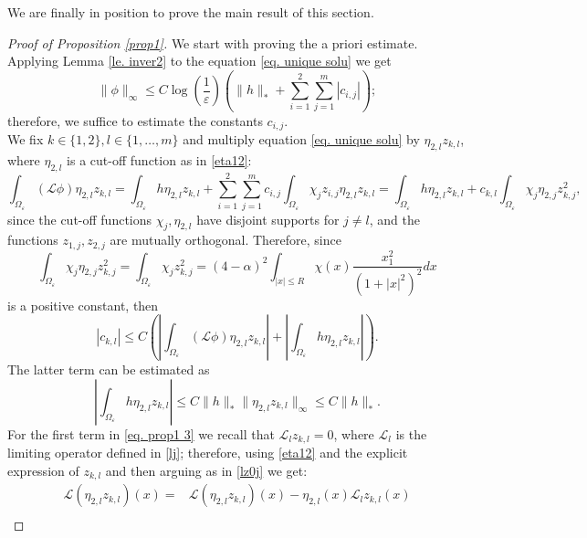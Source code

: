 \documentclass[11pt]{article}
\begin{document}
We are finally in position to prove the main result of this section.
\begin{proof}[Proof of Proposition \ref{prop1}]
We start with proving the a priori estimate.\\
Applying Lemma \ref{le. inver2} to the equation \eqref{eq. unique solu} we get
\begin{equation}\label{eq. prop1 1}
\|\phi\|_\infty\le C\log\left(\frac1\varepsilon\right)\left(\|h\|_\ast+\sum_{i=1}^2\sum_{j=1}^m|c_{i,j}|\right);
\end{equation}
therefore, we suffice to estimate the constants $c_{i,j}$.\\
We fix $k\in\{1,2\},l\in\{1,\dots,m\}$ and multiply equation \eqref{eq. unique solu} by $\eta_{2,l}z_{k,l}$, where $\eta_{2,l}$ is a cut-off function as in \eqref{eta12}:
$$\int_{\Omega_\varepsilon}(\mathcal L\phi)\eta_{2,l}z_{k,l}=\int_{\Omega_\varepsilon}h\eta_{2,l}z_{k,l}+\sum_{i=1}^2\sum_{j=1}^mc_{i,j}\int_{\Omega_\varepsilon}\chi_jz_{i,j}\eta_{2,l}z_{k,l}=\int_{\Omega_\varepsilon}h\eta_{2,l}z_{k,l}+c_{k,l}\int_{\Omega_\varepsilon}\chi_j\eta_{2,j}z_{k,j}^2,$$
since the cut-off functions $\chi_j,\eta_{2,l}$ have disjoint supports for $j\ne l$, and the functions $z_{1,j},z_{2,j}$ are mutually orthogonal. Therefore, since
\begin{equation}\label{integralckl}\int_{\Omega_\varepsilon}\chi_j\eta_{2,j}z_{k,j}^2=\int_{\Omega_\varepsilon}\chi_jz_{k,j}^2=(4-\alpha)^2\int_{|x|\le R}\chi(x)\frac{x_1^2}{\left(1+|x|^2\right)^2}dx
\end{equation}
is a positive constant, then
\begin{equation}\label{eq. prop1 3}
|c_{k,l}|\le C\left(\left|\int_{\Omega_\varepsilon}(\mathcal L\phi)\eta_{2,l}z_{k,l}\right|+\left|\int_{\Omega_\varepsilon}h\eta_{2,l}z_{k,l}\right|\right).
\end{equation}
The latter term can be estimated as
\begin{equation}\label{eq. prop1 4}
\left|\int_{\Omega_\varepsilon}h\eta_{2,l}z_{k,l}\right|\le C\|h\|_\ast\|\eta_{2,l}z_{k,l}\|_\infty\le C\|h\|_\ast.
\end{equation}
For the first term in \eqref{eq. prop1 3} we recall that $\mathcal L_lz_{k,l}=0$, where $\mathcal L_l$ is the limiting operator defined in \eqref{lj}; therefore, using \eqref{eta12} and the explicit expression of $z_{k,l}$ and then arguing as in \eqref{lz0j} we get:
\begin{align*}
\mathcal L(\eta_{2,l}z_{k,l})(x)=&\mathcal L(\eta_{2,l}z_{k,l})(x)-\eta_{2,l}(x)\mathcal L_lz_{k,l}(x)\\

\end{align*}
\end{proof}
\end{document}
